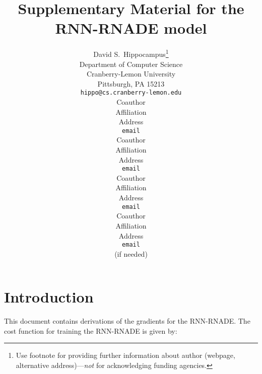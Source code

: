 \documentclass{article} %
\title{Supplementary Material for the RNN-RNADE model}
\author{
David S.~Hippocampus\thanks{ Use footnote for providing further information
about author (webpage, alternative address)---\emph{not} for acknowledging
funding agencies.} \\
Department of Computer Science\\
Cranberry-Lemon University\\
Pittsburgh, PA 15213 \\
\texttt{hippo@cs.cranberry-lemon.edu} \\
\And
Coauthor \\
Affiliation \\
Address \\
\texttt{email} \\
\AND
Coauthor \\
Affiliation \\
Address \\
\texttt{email} \\
\And
Coauthor \\
Affiliation \\
Address \\
\texttt{email} \\
\And
Coauthor \\
Affiliation \\
Address \\
\texttt{email} \\
(if needed)\\
}
\begin{document}
\maketitle


\section{Introduction}



This document contains derivations of the gradients for the RNN-RNADE. 
The cost function for training the RNN-RNADE is given by:
\end{document}
